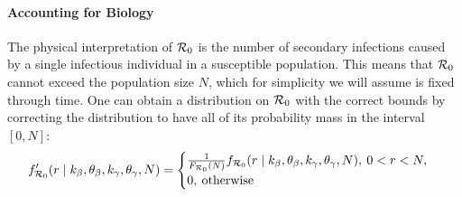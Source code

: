 \documentclass[alpha-refs]{wiley-article}
\newcommand{\rr}{ {\cal R}_0 }						%
\begin{document}
\paragraph{Accounting for Biology}

The physical interpretation of $\rr$ is the number of secondary infections caused by a single infectious individual in a susceptible population.
This means that $\rr$ cannot exceed the population size $N$, which for simplicity we will assume is fixed through time.
One can obtain a distribution on $\rr$ with the correct bounds by correcting the distribution to have all of its probability mass in the interval $[0, N]$:
\begin{equation}
f_{\rr}^\prime(r \mid k_{\beta}, \theta_{\beta}, k_{\gamma}, \theta_{\gamma}, N) =  
 \begin{cases}
  \frac{1}{ F_{\rr}(N)} f_{\rr}(r \mid k_{\beta}, \theta_{\beta},  k_{\gamma}, \theta_{\gamma}, N ), \:  0 < r < N, \\
  0, \: \text{otherwise}
 \end{cases}
\end{equation}

\end{document}
